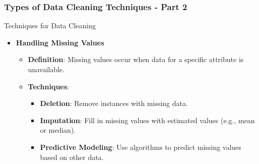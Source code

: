 \documentclass[aspectratio=169]{beamer}
\begin{document}
\begin{frame}[fragile]
    \frametitle{Types of Data Cleaning Techniques - Part 2}
    \begin{block}{Techniques for Data Cleaning}
        \begin{itemize}
            \item \textbf{Handling Missing Values}
                \begin{itemize}
                    \item \textbf{Definition}: Missing values occur when data for a specific attribute is unavailable.
                    \item \textbf{Techniques}:
                        \begin{itemize}
                            \item \textbf{Deletion}: Remove instances with missing data.
                            \item \textbf{Imputation}: Fill in missing values with estimated values (e.g., mean or median).
                            \item \textbf{Predictive Modeling}: Use algorithms to predict missing values based on other data.
                        \end{itemize}
                \end{itemize}
        \end{itemize}
    \end{block}
\end{frame}
\end{document}
